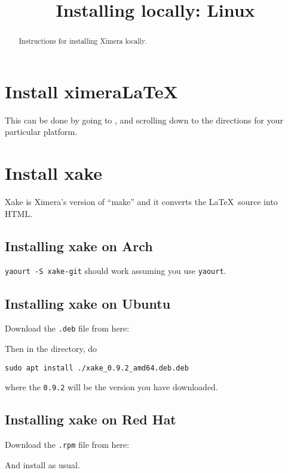 \documentclass{ximera}
\title{Installing locally: Linux}
\begin{document}
\begin{abstract}
Instructions for installing Ximera locally.
\end{abstract}
\maketitle



\section{Install ximeraLaTeX}

This can be done by going to , and scrolling
down to the directions for your particular platform.




\section{Install xake}

Xake is Ximera's version of ``make'' and it converts the
\LaTeX\ source into HTML.

\subsection{Installing xake on Arch}

\verb!yaourt -S xake-git! should work assuming you use \texttt{yaourt}.

  
\subsection{Installing xake on Ubuntu}

Download the \verb|.deb| file from here:


Then in the directory, do

\begin{verbatim}
sudo apt install ./xake_0.9.2_amd64.deb.deb
\end{verbatim}

where the \verb|0.9.2| will be the version you have downloaded.

\subsection{Installing xake on Red Hat}

Download the \verb|.rpm| file from here:


And install as usual. 
\end{document}
